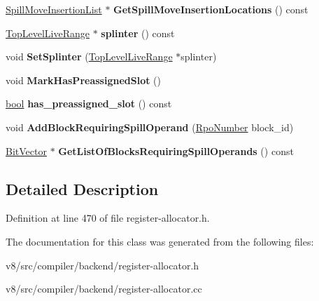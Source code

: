 \begin{DoxyCompactItemize}
\mbox{\hyperlink{structv8_1_1internal_1_1compiler_1_1TopLevelLiveRange_1_1SpillMoveInsertionList}{Spill\+Move\+Insertion\+List}} $\ast$ {\bfseries Get\+Spill\+Move\+Insertion\+Locations} () const
\item 
\mbox{\label{classv8_1_1internal_1_1compiler_1_1TopLevelLiveRange_ae0bf08ed9478b6984d86646a148a3126}} 
\mbox{\hyperlink{classv8_1_1internal_1_1compiler_1_1TopLevelLiveRange}{Top\+Level\+Live\+Range}} $\ast$ {\bfseries splinter} () const
\item 
\mbox{\label{classv8_1_1internal_1_1compiler_1_1TopLevelLiveRange_a14b61397e982091cf773eee7c825c821}} 
void {\bfseries Set\+Splinter} (\mbox{\hyperlink{classv8_1_1internal_1_1compiler_1_1TopLevelLiveRange}{Top\+Level\+Live\+Range}} $\ast$splinter)
\item 
\mbox{\label{classv8_1_1internal_1_1compiler_1_1TopLevelLiveRange_ad109f38bc2031a5a71313c2e87a6abf6}} 
void {\bfseries Mark\+Has\+Preassigned\+Slot} ()
\item 
\mbox{\label{classv8_1_1internal_1_1compiler_1_1TopLevelLiveRange_a0fd7abc82656e9184dcb30a2f387bee4}} 
\mbox{\hyperlink{classbool}{bool}} {\bfseries has\+\_\+preassigned\+\_\+slot} () const
\item 
\mbox{\label{classv8_1_1internal_1_1compiler_1_1TopLevelLiveRange_aa7d6db0980fa252191515870ea453b55}} 
void {\bfseries Add\+Block\+Requiring\+Spill\+Operand} (\mbox{\hyperlink{classv8_1_1internal_1_1compiler_1_1RpoNumber}{Rpo\+Number}} block\+\_\+id)
\item 
\mbox{\label{classv8_1_1internal_1_1compiler_1_1TopLevelLiveRange_a2b25baaec9fbf6af64ca627f5a92450d}} 
\mbox{\hyperlink{classv8_1_1internal_1_1BitVector}{Bit\+Vector}} $\ast$ {\bfseries Get\+List\+Of\+Blocks\+Requiring\+Spill\+Operands} () const
\end{DoxyCompactItemize}


\subsection{Detailed Description}


Definition at line 470 of file register-\/allocator.\+h.



The documentation for this class was generated from the following files\+:\begin{DoxyCompactItemize}
\item 
v8/src/compiler/backend/register-\/allocator.\+h\item 
v8/src/compiler/backend/register-\/allocator.\+cc\end{DoxyCompactItemize}
